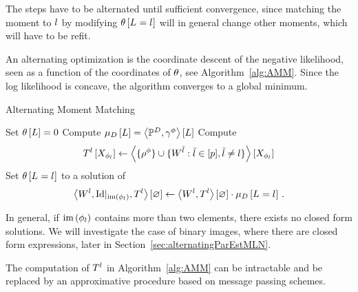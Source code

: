 The steps have to be alternated until sufficient convergence, since matching the moment to $l$ by modifying $\theta\left[L_{}=l_{}\right]$ will in general change other moments, which will have to be refit.


An alternating optimization is the coordinate descent of the negative likelihood, seen as a function of the coordinates of $\theta$, see Algorithm~\ref{alg:AMM}.
Since the log likelihood is concave, the algorithm converges to a global minimum.



\begin{algorithm}[h!]
\caption{Alternating Moment Matching}\label{alg:AMM}
\begin{algorithmic}
\State Set $\theta\left[L\right]=0$
\State Compute $\mu_{D}\left[L\right]= \left\langle \mathbb{P}^{D},\gamma^{\phi}\right\rangle \left[ L \right]$
{}
\For{$\selindexin$}
	\State Compute 
		\begin{align*}
			T^{l}\left[X_{\phi_{l}}\right] 
			\leftarrow \left\langle \{\rho^{\phi}\}\cup\{W^{\tilde{l}} : \tilde{l} \in [p], \tilde{l}\neq l\}\right\rangle \left[ X_{\phi_{l}} \right] 
		\end{align*}
	\State Set $\theta\left[L_{}=l_{}\right]$ to a solution of 
	\begin{align*}
		\left\langle W^{l},{\mathrm{Id}}|_{\mathrm{im}\left(\phi_{l}\right)},T^{l}\right\rangle \left[ \varnothing \right]
		\leftarrow \left\langle W^{l},T^{l}\right\rangle \left[ \varnothing \right] \cdot \mu_{D}\left[L_{}=l_{}\right] \, . 
	\end{align*}
\EndFor
\EndWhile
\end{algorithmic}
\end{algorithm}


% 
In general, if $\mathrm{im}\left(\phi_{l}\right)$ contains more than two elements, there exists no closed form solutions.
We will investigate the case of binary images, where there are closed form expressions, later in Section~\ref{sec:alternatingParEstMLN}.


%
The computation of $T^{l}$ in Algorithm~\ref{alg:AMM} can be intractable and be replaced by an approximative procedure based on message passing schemes.

